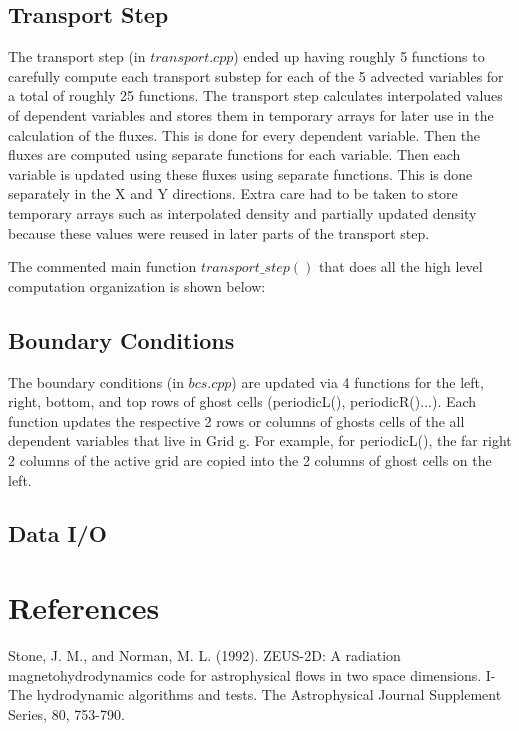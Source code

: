 \subsection{Transport Step}
The transport step (in $transport.cpp$) ended up having roughly 5 functions to carefully compute each transport substep for each of the 5 advected variables for a total of roughly 25 functions. The transport step calculates interpolated values of dependent variables and stores them in temporary arrays for later use in the calculation of the fluxes. This is done for every dependent variable. Then the fluxes are computed using separate functions for each variable. Then each variable is updated using these fluxes using separate functions. This is done separately in the X and Y directions. Extra care had to be taken to store temporary arrays such as interpolated density and partially updated density because these values were reused in later parts of the transport step. 

The commented main function $transport\_step()$ that does all the high level computation organization is shown below:
\subsection{Boundary Conditions}
The boundary conditions (in $bcs.cpp$) are updated via 4 functions for the left, right, bottom, and top rows of ghost cells (periodicL(), periodicR()...). Each function updates the respective 2 rows or columns of ghosts cells of the all dependent variables that live in Grid g. For example, for periodicL(), the far right 2 columns of the active grid are copied into the 2 columns of ghost cells on the left.    
\subsection{Data I/O}
\section{References}
Stone, J. M., and Norman, M. L. (1992). ZEUS-2D: A radiation magnetohydrodynamics code for astrophysical flows in two space dimensions. I-The hydrodynamic algorithms and tests. The Astrophysical Journal Supplement Series, 80, 753-790.


